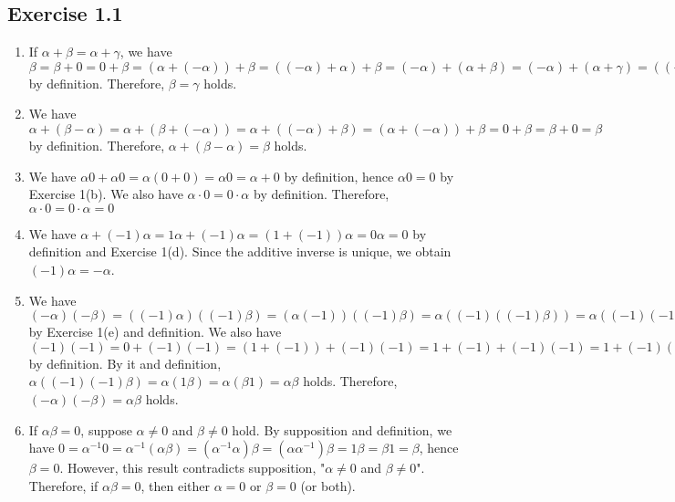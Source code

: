 \documentclass{article}
\begin{document}
\subsection{Exercise 1.1}
\begin{enumerate}[label = (\alph*), resume]
  \item If $\alpha + \beta = \alpha + \gamma$, 
    we have $\beta = \beta + 0 = 0 + \beta = (\alpha + (-\alpha)) + \beta = ((-\alpha) + \alpha) + \beta = (-\alpha) + (\alpha + \beta) = (-\alpha) + (\alpha + \gamma) = ((-\alpha) + \alpha) + \gamma = (\alpha + (-\alpha)) + \gamma = 0 + \gamma = \gamma + 0 = \gamma$ by definition.
    Therefore, $\beta = \gamma$ holds.

  \item We have $\alpha + (\beta - \alpha) = \alpha + (\beta + (-\alpha)) = \alpha + ((-\alpha) + \beta) = (\alpha + (-\alpha)) + \beta = 0 + \beta = \beta + 0 = \beta$ by definition.
    Therefore, $\alpha + (\beta - \alpha) = \beta$ holds.
    
  \item We have $\alpha0 + \alpha0 = \alpha(0 + 0) = \alpha0 = \alpha + 0$ by definition,
    hence $\alpha0 = 0$ by Exercise 1(b).
    We also have $\alpha\cdot0 = 0\cdot\alpha$ by definition.
    Therefore, $\alpha\cdot0 = 0\cdot\alpha = 0$
    
  \item We have $\alpha + (-1)\alpha = 1\alpha + (-1)\alpha = (1 + (-1))\alpha = 0\alpha = 0$ by definition and Exercise 1(d).
      Since the additive inverse is unique,
      we obtain $(-1)\alpha = -\alpha$.
    
  \item We have $(-\alpha)(-\beta) = ((-1)\alpha)((-1)\beta) = (\alpha(-1))((-1)\beta) = \alpha((-1)((-1)\beta)) = \alpha((-1)(-1)\beta)$ by Exercise 1(e) and definition.
    We also have $(-1)(-1) = 0 + (-1)(-1) = (1 + (-1)) + (-1)(-1) = 1 + (-1) + (-1)(-1) = 1 + (-1)((-1) + 1) = 1 + (-1)(1 + (-1)) = 1 + (-1)0 = 1 + 0 = 1$ by definition.
    By it and definition, $\alpha((-1)(-1)\beta) = \alpha(1\beta) = \alpha(\beta1) = \alpha\beta$ holds.
    Therefore, $(-\alpha)(-\beta) = \alpha\beta$ holds.
    
  \item If $\alpha\beta = 0$,
    suppose $\alpha \neq 0$ and $\beta \neq 0$ hold.
    By supposition and definition, we have $0 = \alpha^{-1}0 = \alpha^{-1}(\alpha\beta) = (\alpha^{-1}\alpha)\beta = (\alpha\alpha^{-1})\beta = 1\beta = \beta1 = \beta$,
    hence $\beta = 0$.
    However, this result contradicts supposition, "$\alpha \neq 0$ and $\beta \neq 0$".
    Therefore, if $\alpha\beta = 0$, then either $\alpha = 0$ or $\beta = 0$ (or both).
\end{enumerate}
\end{document}
